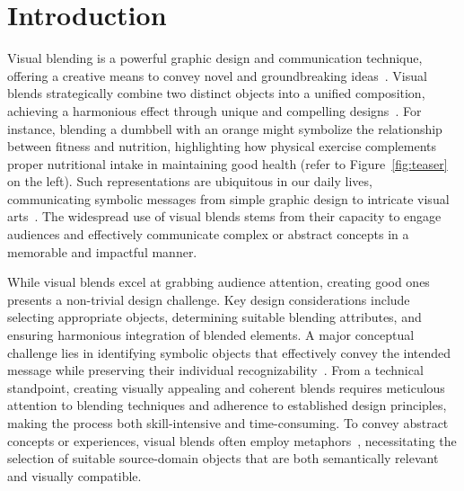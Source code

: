 \section{Introduction}

Visual blending is a powerful graphic design and communication technique, offering a creative means to convey novel and groundbreaking ideas~\cite{Cunha2020LetsFT, 10.1145/3290605.3300402}.
Visual blends strategically combine two distinct objects into a unified composition, achieving a harmonious effect through unique and compelling designs~\cite{10.1145/3290605.3300402, 10.1007/s00354-020-00107-x, 10.1145/3411764.3445089}.
For instance, blending a dumbbell with an orange might symbolize the relationship between fitness and nutrition, highlighting how physical exercise complements proper nutritional intake in maintaining good health (refer to Figure~\ref{fig:teaser} on the left).
Such representations are ubiquitous in our daily lives, communicating symbolic messages from simple graphic design to intricate visual arts~\cite{10.1086/209396, benczes2009visual}.
The widespread use of visual blends stems from their capacity to engage audiences and effectively communicate complex or abstract concepts in a memorable and impactful manner.

While visual blends excel at grabbing audience attention, creating good ones presents a non-trivial design challenge.
Key design considerations include selecting appropriate objects, determining suitable blending attributes, and ensuring harmonious integration of blended elements.
A major conceptual challenge lies in identifying symbolic objects that effectively convey the intended message while preserving their individual recognizability~\cite{10.1145/3290605.3300402}.
From a technical standpoint, creating visually appealing and coherent blends requires meticulous attention to blending techniques and adherence to established design principles, making the process both skill-intensive and time-consuming.
To convey abstract concepts or experiences, visual blends often employ metaphors~\cite{MetaCLUE_10204033,grady1999blending,10.1145/3290605.3300402}, necessitating the selection of suitable source-domain objects that are both semantically relevant and visually compatible.





